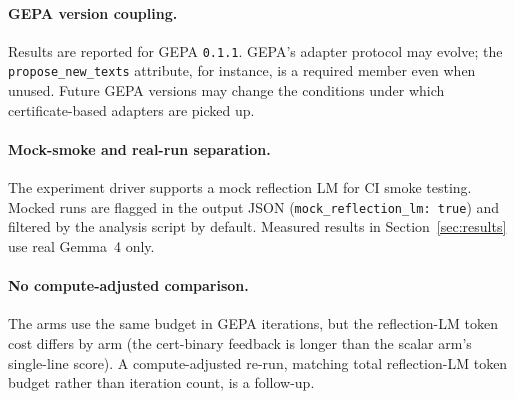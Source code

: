 \paragraph{GEPA version coupling.}  Results are reported for GEPA
\texttt{0.1.1}.  GEPA's adapter protocol may evolve; the
\texttt{propose\_new\_texts} attribute, for instance, is a required
member even when unused.  Future GEPA versions may change the
conditions under which certificate-based adapters are picked up.

\paragraph{Mock-smoke and real-run separation.}  The experiment
driver supports a mock reflection LM for CI smoke testing.  Mocked
runs are flagged in the output JSON (\texttt{mock\_reflection\_lm:
true}) and filtered by the analysis script by default.  Measured
results in Section~\ref{sec:results} use real Gemma~4 only.

\paragraph{No compute-adjusted comparison.}  The arms use the same
budget in GEPA iterations, but the reflection-LM token cost differs
by arm (the cert-binary feedback is longer than the scalar arm's
single-line score).  A compute-adjusted re-run, matching total
reflection-LM token budget rather than iteration count, is a
follow-up.
